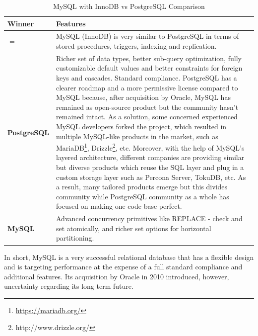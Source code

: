 \begin{table}[H]
  \centering
  \caption{MySQL with InnoDB vs PostgreSQL Comparison}
  \renewcommand{\arraystretch}{1.5}
  \begin{tabular}{| >{\centering\bfseries}m{1in} | >{\centering\arraybackslash}m{4.5in} |}
	\hline
    \textbf{Winner} & \textbf{Features} \\
	\hline
    $=$ & MySQL (InnoDB) is very similar to PostgreSQL in terms of stored procedures, triggers, indexing and replication. \\ \hline
    PostgreSQL & Richer set of data types, better sub-query optimization, fully customizable default values and better constraints for foreign keys and cascades. Standard compliance. PostgreSQL has a clearer roadmap and a more permissive license compared to MySQL because, after acquisition by Oracle, MySQL has remained as open-source product but the community hasn't remained intact. As a solution, some concerned experienced MySQL developers forked the project, which resulted in multiple MySQL-like products in the market, such as MariaDB\footnote{\url{https://mariadb.org/}}, Drizzle\footnote{http://www.drizzle.org/}, etc. Moreover, with the help of MySQL's layered architecture, different companies are providing similar but diverse products which reuse the SQL layer and plug in a custom storage layer such as Percona Server, TokuDB, etc. As a result, many tailored products emerge but this divides community while PostgreSQL community as a whole has focused on making one code base perfect. \\ \hline
    MySQL & Advanced concurrency primitives like REPLACE - check and set atomically, and richer set options for horizontal partitioning. \\ \hline    
  \end{tabular}
  \label{mysql}
\end{table}

In short, MySQL is a very successful relational database that has a flexible design and is targeting performance at the expense of a full standard compliance and additional features. Its acquisition by Oracle in 2010 introduced, however, uncertainty regarding its long term future.

